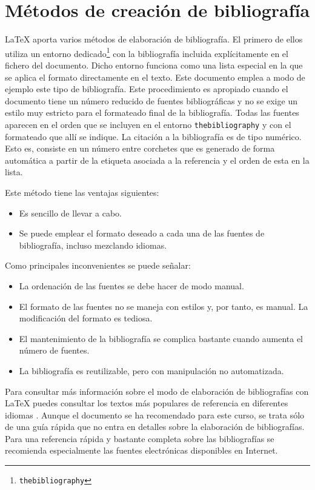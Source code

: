 \documentclass[11pt,a4paper]{article}
\begin{document}
\section{Métodos de creación de bibliografía}
\LaTeX{} aporta varios métodos de elaboración de bibliografía. El primero de ellos utiliza un entorno dedicado\footnote{ \texttt{thebibliography}} con la bibliografía incluida explícitamente en el fichero del documento. Dicho entorno funciona como una lista especial en la que se aplica el formato directamente en el texto. Este documento emplea a modo de ejemplo este tipo de bibliografía. Este procedimiento es apropiado cuando el documento tiene un número reducido de fuentes bibliográficas y no se exige un estilo muy estricto para el formateado final de la bibliografía. Todas las fuentes aparecen en el orden que se incluyen en el entorno \texttt{thebibliography} y con el formateado que allí se indique. La citación a la bibliografía es de tipo numérico. Esto es, consiste en un número entre corchetes que es generado de forma automática a partir de la etiqueta asociada a la referencia y el orden de esta en la lista.
	

\noindent Este método tiene las ventajas siguientes:
\begin{itemize}[]
	\item Es sencillo de llevar a cabo.
	
	\item Se puede emplear el formato deseado a cada una de las fuentes de bibliografía, incluso mezclando idiomas.
\end{itemize}

\noindent Como principales inconvenientes se puede señalar:
\begin{itemize}[]
	\item La ordenación de las fuentes se debe hacer de modo manual.
	
	\item El formato de las fuentes no se maneja con estilos y, por tanto, es manual. La modificación del formato es tediosa.
	
	\item El mantenimiento de la bibliografía se complica bastante cuando aumenta el número de fuentes.
	
	\item La bibliografía es reutilizable, pero con manipulación no automatizada.
\end{itemize}


Para consultar más información sobre el modo de elaboración de bibliografías con \LaTeX{} puedes consultar los textos más populares de referencia en diferentes idiomas \cite[en inglés]{KopDal2003,Lam1994,MitGooBra2004} \cite[en español]{CasLucMir2000,CasLucMir2003}. Aunque el documento \cite{lshort2009} se ha recomendado para este curso, se trata sólo de una guía rápida que no entra en detalles sobre la elaboración de bibliografías. Para una referencia rápida y bastante completa sobre las bibliografías se recomienda especialmente las fuentes electrónicas \cite{Rob2010,wiki2010} disponibles en Internet.
\end{document}
